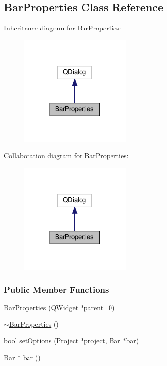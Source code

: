 \hypertarget{class_bar_properties}{}\subsection{Bar\+Properties Class Reference}
\label{class_bar_properties}


Inheritance diagram for Bar\+Properties\+:
\nopagebreak
\begin{figure}[H]
\begin{center}
\leavevmode
\includegraphics[width=156pt]{class_bar_properties__inherit__graph}
\end{center}
\end{figure}


Collaboration diagram for Bar\+Properties\+:
\nopagebreak
\begin{figure}[H]
\begin{center}
\leavevmode
\includegraphics[width=156pt]{class_bar_properties__coll__graph}
\end{center}
\end{figure}
\subsubsection*{Public Member Functions}
\begin{DoxyCompactItemize}
\item 
\hyperlink{class_bar_properties_a7c14a54f430cabfe872869799076025b}{Bar\+Properties} (Q\+Widget $\ast$parent=0)
\item 
\hyperlink{class_bar_properties_a639b4da849970025a2935ee965d6a465}{$\sim$\+Bar\+Properties} ()
\item 
bool \hyperlink{class_bar_properties_a0a9a2284b5aad8acbade86ccec7adbf8}{set\+Options} (\hyperlink{class_project}{Project} $\ast$project, \hyperlink{class_bar}{Bar} $\ast$\hyperlink{class_bar_properties_a65d09e7315764cd4ad33b5a0ded32090}{bar})
\item 
\hyperlink{class_bar}{Bar} $\ast$ \hyperlink{class_bar_properties_a65d09e7315764cd4ad33b5a0ded32090}{bar} ()
\end{DoxyCompactItemize}


